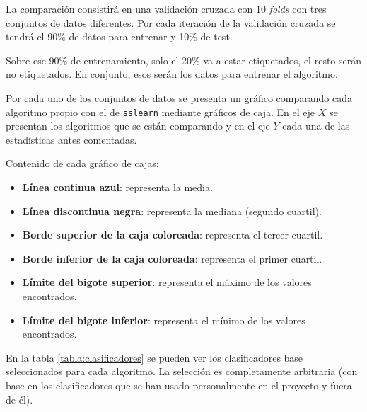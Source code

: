 La comparación consistirá en una validación cruzada con 10 \textit{folds} con
tres conjuntos de datos diferentes. Por cada iteración de la validación cruzada
se tendrá el 90\% de datos para entrenar y 10\% de test.

Sobre ese 90\% de entrenamiento, solo el 20\% va a estar etiquetados, el resto
serán no etiquetados. En conjunto, esos serán los datos para entrenar el
algoritmo.

Por cada uno de los conjuntos de datos se presenta un gráfico comparando cada
algoritmo propio con el de \texttt{sslearn} mediante gráficos de caja. En el eje
$X$ se presentan los algoritmos que se están comparando y en el eje $Y$ cada una de
las estadísticas antes comentadas.

Contenido de cada gráfico de cajas:
\vspace{-0.4cm}
\begin{itemize}
    \item \textbf{Línea continua azul}: representa la media.
    \item \textbf{Línea discontinua negra}: representa la mediana (segundo
    cuartil).
    \item \textbf{Borde superior de la caja coloreada}: representa el tercer cuartil.
    \item \textbf{Borde inferior de la caja coloreada}: representa el primer cuartil.
    \item \textbf{Límite del bigote superior}: representa el máximo de los valores
    encontrados.
    \item \textbf{Límite del bigote inferior}: representa el mínimo de los valores
    encontrados.
\end{itemize}

En la tabla \ref{tabla:clasificadores} se pueden ver los clasificadores base
seleccionados para cada algoritmo. La selección es completamente arbitraria (con
base en los clasificadores que se han usado personalmente en el proyecto y fuera
de él).

\begin{table}[H]
    \centering
\caption{Clasificadores base}
\label{tabla:clasificadores}
\end{table}


